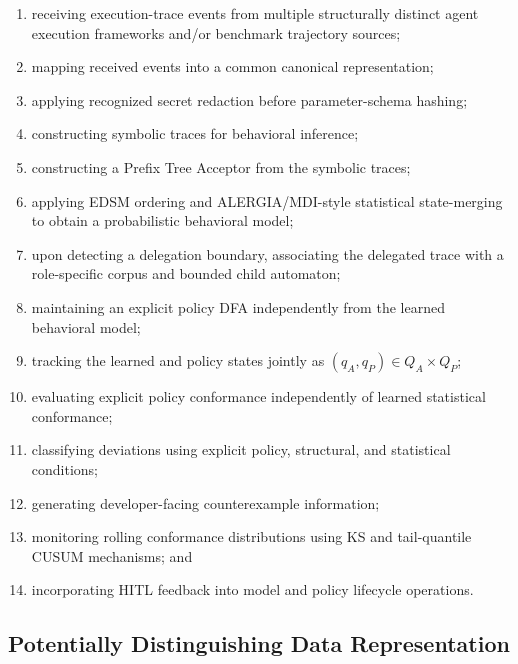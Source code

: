 \documentclass[11pt,a4paper]{article}
\begin{document}
\begin{enumerate}[leftmargin=1.6em]

\item receiving execution-trace events from multiple structurally distinct agent
execution frameworks and/or benchmark trajectory sources;

\item mapping received events into a common canonical representation;

\item applying recognized secret redaction before parameter-schema hashing;

\item constructing symbolic traces for behavioral inference;

\item constructing a Prefix Tree Acceptor from the symbolic traces;

\item applying EDSM ordering and ALERGIA/MDI-style statistical state-merging to obtain a
probabilistic behavioral model;

\item upon detecting a delegation boundary, associating the delegated trace with a
role-specific corpus and bounded child automaton;

\item maintaining an explicit policy DFA independently from the learned behavioral model;

\item tracking the learned and policy states jointly as
$(q_A,q_P)\in Q_A\times Q_P$;

\item evaluating explicit policy conformance independently of learned statistical
conformance;

\item classifying deviations using explicit policy, structural, and statistical
conditions;

\item generating developer-facing counterexample information;

\item monitoring rolling conformance distributions using KS and tail-quantile CUSUM
mechanisms; and

\item incorporating HITL feedback into model and policy lifecycle operations.
\end{enumerate}

\subsection{Potentially Distinguishing Data Representation}
\end{document}
